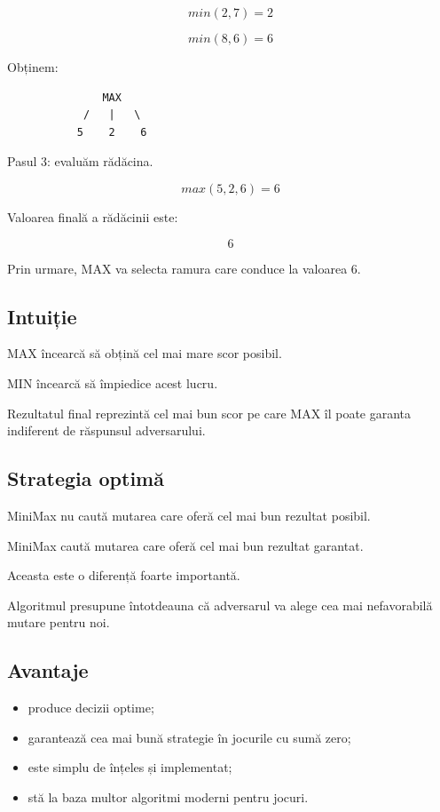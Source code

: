 \documentclass[12pt,a4paper]{article}
\begin{document}
\[
min(2,7)=2
\]

\[
min(8,6)=6
\]

Obținem:

\begin{verbatim}
               MAX
            /   |   \
           5    2    6
\end{verbatim}

Pasul 3: evaluăm rădăcina.

\[
max(5,2,6)=6
\]

Valoarea finală a rădăcinii este:

\[
6
\]

Prin urmare, MAX va selecta ramura care conduce la valoarea 6.

\subsection{Intuiție}

MAX încearcă să obțină cel mai mare scor posibil.

MIN încearcă să împiedice acest lucru.

Rezultatul final reprezintă cel mai bun scor pe care MAX îl poate garanta indiferent de răspunsul adversarului.

\subsection{Strategia optimă}

MiniMax nu caută mutarea care oferă cel mai bun rezultat posibil.

MiniMax caută mutarea care oferă cel mai bun rezultat garantat.

Aceasta este o diferență foarte importantă.

Algoritmul presupune întotdeauna că adversarul va alege cea mai nefavorabilă mutare pentru noi.

\subsection{Avantaje}

\begin{itemize}
\item produce decizii optime;
\item garantează cea mai bună strategie în jocurile cu sumă zero;
\item este simplu de înțeles și implementat;
\item stă la baza multor algoritmi moderni pentru jocuri.
\end{itemize}
\end{document}
